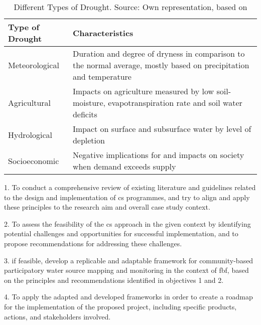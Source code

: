\begin{table}
    \caption[Drought Types]{Different Types of Drought. Source: Own representation, based on \autocite{rcrcFORECASTBASEDFINANCINGEARLY2020,wilhiteUnderstandingDroughtPhenomenon1985}}
    \begin{adjustbox}{center,max width=\linewidth}
        \def\arraystretch{1.5}
        \begin{tabular}{m{2cm}m{5cm}}
            \toprule
            \bf Type of Drought & \bf Characteristics  \\ 
            \midrule
            Meteorological      & Duration and degree of dryness in comparison to the normal average, mostly based on precipitation and temperature  \\ 
            Agricultural        & Impacts on agriculture measured by low soil-moisture, evapotranspiration rate and soil water deficits  \\ 
            Hydrological        & Impact on surface and subsurface water by level of depletion  \\ 
            Socioeconomic       & Negative implications for and impacts on society when demand exceeds supply  \\ 
            \bottomrule
        \end{tabular}
    \end{adjustbox}
    \label{tab:th_drought_types}
\end{table}





1. To conduct a comprehensive review of existing literature and guidelines related to the design and implementation of \acrlong{cs} programmes, and try to align and apply these principles to the research aim and overall case study context.

2. To assess the feasibility of the \acrlong{cs} approach in the given context by identifying potential challenges and opportunities for successful implementation, and to propose recommendations for addressing these challenges.

3. if feasible, develop a replicable and adaptable framework for community-based participatory water source mapping and monitoring in the context of \acrlong{fbf}, based on the principles and recommendations identified in objectives 1 and 2.

4. To apply the adapted and developed frameworks in order to create a roadmap for the implementation of the proposed project, including specific products, actions, and stakeholders involved.

